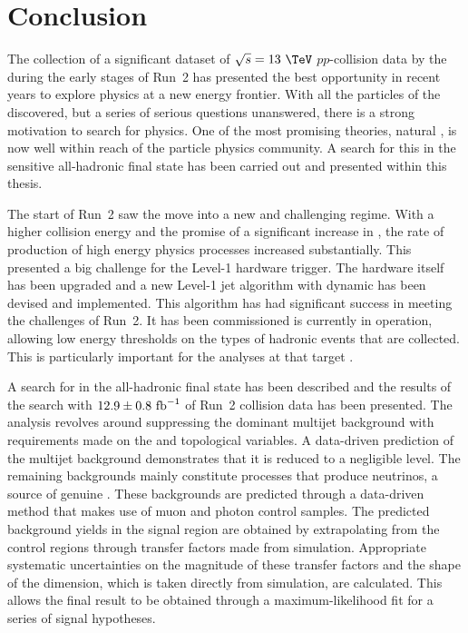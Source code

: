 \chapter{Conclusion}
\label{chap:conclusion}

The collection of a significant dataset of $\sqrt{s}=13~\tev$
$pp$-collision data by the \LHC during the early stages of Run~2 has
presented the best opportunity in recent years to explore \BSM physics
at a new energy frontier. With all the particles of the \SM
discovered, but a series of serious questions unanswered, there is a
strong motivation to search for \BSM physics. One of the most
promising \BSM theories, natural \SUSY, is now well within reach of
the particle physics community. A search for this in the
sensitive all-hadronic final state has been carried out and presented
within this thesis.

The start of Run~2 saw the \LHC move into a new and challenging
regime. With a higher collision energy and the promise of a
significant increase in \PU, the rate of production of high energy
physics processes increased substantially. This presented a
big challenge for the Level-1 hardware trigger. The hardware itself has been upgraded and a new Level-1 jet
algorithm with dynamic \PUS has been devised and implemented. This
algorithm has had significant success in meeting the challenges of
Run~2. It has been commissioned is currently
in operation, allowing low energy thresholds on the types of hadronic
events that are collected. This is particularly important for the analyses at \CMS that
target \SUSY.

A search for \SUSY in the all-hadronic final state has been described
and the results of the search with $12.9\pm0.8~\text{fb}^{-1}$ of Run~2
collision data has been presented. The analysis revolves around
suppressing the dominant \QCD multijet background with requirements
made on the \alphat and \bdphi topological variables. A data-driven
prediction of the multijet background demonstrates that it
is reduced to a negligible level. The remaining backgrounds 
mainly constitute \SM processes that produce neutrinos, a
source of genuine \MET. These backgrounds are predicted through a
data-driven method that makes use of muon and photon control samples.
The predicted background yields in the signal region are obtained by
extrapolating from the control regions through transfer factors made
from
simulation. Appropriate systematic uncertainties on the magnitude of
these transfer factors and the shape of the \MHT dimension, which is
taken directly from simulation, are calculated. This allows the final result to
be obtained through a maximum-likelihood fit for a series of signal
hypotheses.

